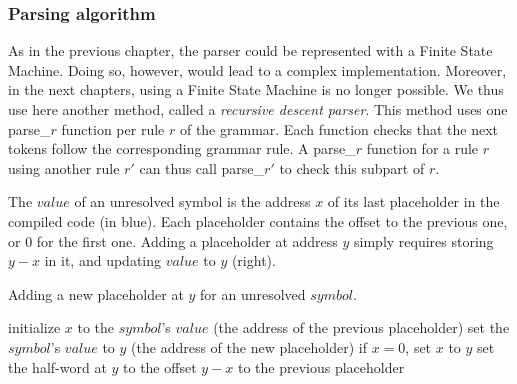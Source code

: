 \subsubsection{Parsing algorithm}

As in the previous chapter, the parser could be represented with a Finite State
Machine. Doing so, however, would lead to a complex implementation. Moreover,
in the next chapters, using a Finite State Machine is no longer possible. We
thus use here another method, called a {\em recursive descent parser}. This
method uses one parse\_$r$ function per rule $r$ of the grammar. Each function
checks that the next tokens follow the corresponding grammar rule. A parse\_$r$
function for a rule $r$ using another rule $r'$ can thus call parse\_$r'$ to
check this subpart of $r$.

\begin{Figure}
  

  \caption{The $value$ of an unresolved symbol is the address $x$ of its last
    placeholder in the compiled code (in blue). Each placeholder contains the
    offset to the previous one, or 0 for the first one. Adding a placeholder at
    address $y$ simply requires storing $y-x$ in it, and updating $value$ to $y$
    (right).}\label{fig:toyc1-placeholders-list}
\end{Figure}

\begin{Algorithm}
\caption{Adding a new placeholder at $y$ for an unresolved
    $symbol$.}\label{alg:toyc1-add-ref}
\begin{algorithmic}[1]
\State initialize $x$ to the $symbol$'s $value$ (the address of the
  previous placeholder)
\State set the $symbol$'s $value$ to $y$ (the address of the new
  placeholder)
\State if $x=0$, set $x$ to $y$
\State set the half-word at $y$ to the offset $y-x$ to the previous
  placeholder
\end{algorithmic}
\end{Algorithm}


